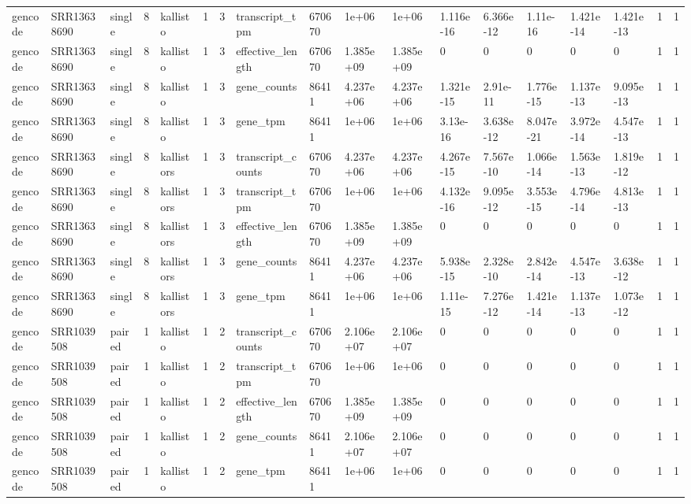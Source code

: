 \begin{tabular}{llllllllllllllllll}
gencode & SRR13638690 & single & 8 & kallisto & 1 & 3 & transcript\_tpm & 670670 & 1e+06 & 1e+06 & 1.116e-16 & 6.366e-12 & 1.11e-16 & 1.421e-14 & 1.421e-13 & 1 & 1 \\
gencode & SRR13638690 & single & 8 & kallisto & 1 & 3 & effective\_length & 670670 & 1.385e+09 & 1.385e+09 & 0 & 0 & 0 & 0 & 0 & 1 & 1 \\
gencode & SRR13638690 & single & 8 & kallisto & 1 & 3 & gene\_counts & 86411 & 4.237e+06 & 4.237e+06 & 1.321e-15 & 2.91e-11 & 1.776e-15 & 1.137e-13 & 9.095e-13 & 1 & 1 \\
gencode & SRR13638690 & single & 8 & kallisto & 1 & 3 & gene\_tpm & 86411 & 1e+06 & 1e+06 & 3.13e-16 & 3.638e-12 & 8.047e-21 & 3.972e-14 & 4.547e-13 & 1 & 1 \\
gencode & SRR13638690 & single & 8 & kallistors & 1 & 3 & transcript\_counts & 670670 & 4.237e+06 & 4.237e+06 & 4.267e-15 & 7.567e-10 & 1.066e-14 & 1.563e-13 & 1.819e-12 & 1 & 1 \\
gencode & SRR13638690 & single & 8 & kallistors & 1 & 3 & transcript\_tpm & 670670 & 1e+06 & 1e+06 & 4.132e-16 & 9.095e-12 & 3.553e-15 & 4.796e-14 & 4.813e-13 & 1 & 1 \\
gencode & SRR13638690 & single & 8 & kallistors & 1 & 3 & effective\_length & 670670 & 1.385e+09 & 1.385e+09 & 0 & 0 & 0 & 0 & 0 & 1 & 1 \\
gencode & SRR13638690 & single & 8 & kallistors & 1 & 3 & gene\_counts & 86411 & 4.237e+06 & 4.237e+06 & 5.938e-15 & 2.328e-10 & 2.842e-14 & 4.547e-13 & 3.638e-12 & 1 & 1 \\
gencode & SRR13638690 & single & 8 & kallistors & 1 & 3 & gene\_tpm & 86411 & 1e+06 & 1e+06 & 1.11e-15 & 7.276e-12 & 1.421e-14 & 1.137e-13 & 1.073e-12 & 1 & 1 \\
gencode & SRR1039508 & paired & 1 & kallisto & 1 & 2 & transcript\_counts & 670670 & 2.106e+07 & 2.106e+07 & 0 & 0 & 0 & 0 & 0 & 1 & 1 \\
gencode & SRR1039508 & paired & 1 & kallisto & 1 & 2 & transcript\_tpm & 670670 & 1e+06 & 1e+06 & 0 & 0 & 0 & 0 & 0 & 1 & 1 \\
gencode & SRR1039508 & paired & 1 & kallisto & 1 & 2 & effective\_length & 670670 & 1.385e+09 & 1.385e+09 & 0 & 0 & 0 & 0 & 0 & 1 & 1 \\
gencode & SRR1039508 & paired & 1 & kallisto & 1 & 2 & gene\_counts & 86411 & 2.106e+07 & 2.106e+07 & 0 & 0 & 0 & 0 & 0 & 1 & 1 \\
gencode & SRR1039508 & paired & 1 & kallisto & 1 & 2 & gene\_tpm & 86411 & 1e+06 & 1e+06 & 0 & 0 & 0 & 0 & 0 & 1 & 1 \\

\end{tabular}
